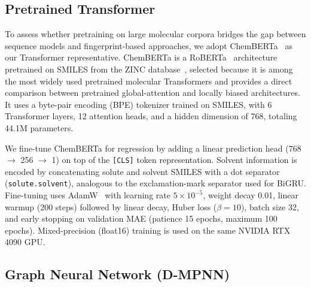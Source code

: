 \documentclass[journal=jcisd8,manuscript=article]{achemso}
\begin{document}
\FloatBarrier
\subsection{Pretrained Transformer}
\label{sec:chemberta}

To assess whether pretraining on large molecular corpora bridges the gap between sequence models and fingerprint-based approaches, we adopt ChemBERTa~\cite{chithrananda2020chemberta} as our Transformer representative.
ChemBERTa is a RoBERTa~\cite{liu2019roberta} architecture pretrained on SMILES from the ZINC database~\cite{irwin2005zinc}, selected because it is among the most widely used pretrained molecular Transformers and provides a direct comparison between pretrained global-attention and locally biased architectures.
It uses a byte-pair encoding (BPE) tokenizer trained on SMILES, with 6 Transformer layers, 12 attention heads, and a hidden dimension of 768, totaling 44.1M parameters.

We fine-tune ChemBERTa for regression by adding a linear prediction head (768 $\to$ 256 $\to$ 1) on top of the \texttt{[CLS]} token representation.
Solvent information is encoded by concatenating solute and solvent SMILES with a dot separator (\texttt{solute.solvent}), analogous to the exclamation-mark separator used for BiGRU.
Fine-tuning uses AdamW~\cite{loshchilov2019decoupled} with learning rate $5 \times 10^{-5}$, weight decay 0.01, linear warmup (200 steps) followed by linear decay, Huber loss ($\beta = 10$), batch size 32, and early stopping on validation MAE (patience 15 epochs, maximum 100 epochs).
Mixed-precision (float16) training is used on the same NVIDIA RTX 4090 GPU.


\subsection{Graph Neural Network (D-MPNN)}
\label{sec:chemprop}
\end{document}
